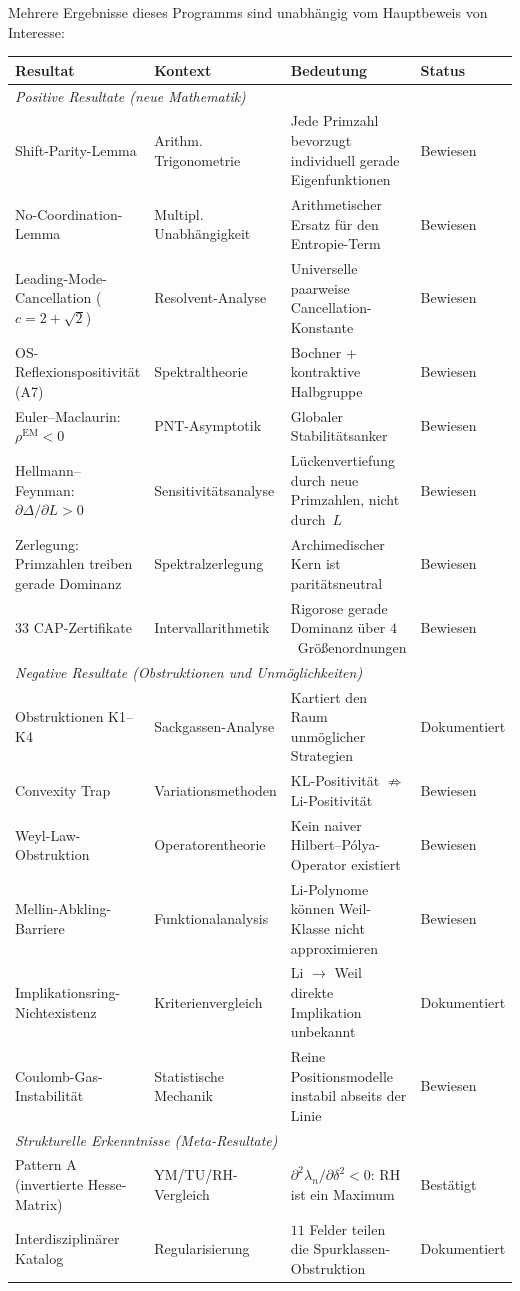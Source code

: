 \documentclass[12pt,a4paper]{article}
\theoremstyle{definition}
\theoremstyle{remark}
\begin{document}
Mehrere Ergebnisse dieses Programms sind unabhängig vom Hauptbeweis von Interesse:

\begin{center}
\small
\renewcommand{\arraystretch}{1.2}
\begin{tabular}{p{4.2cm}|p{3.2cm}|p{4.2cm}|l}
\textbf{Resultat} & \textbf{Kontext} & \textbf{Bedeutung} & \textbf{Status} \\\hline
\multicolumn{4}{l}{\emph{Positive Resultate (neue Mathematik)}} \\[2pt]
Shift-Parity-Lemma & Arithm. Trigonometrie & Jede Primzahl bevorzugt individuell gerade Eigenfunktionen & Bewiesen \\
No-Coordination-Lemma & Multipl. Unabhängigkeit & Arithmetischer Ersatz für den Entropie-Term & Bewiesen \\
Leading-Mode-Cancellation ($c = 2+\sqrt{2}$) & Resolvent-Analyse & Universelle paarweise Cancellation-Konstante & Bewiesen \\
OS-Reflexionspositivität (A7) & Spektraltheorie & Bochner + kontraktive Halbgruppe & Bewiesen \\
Euler--Maclaurin: $\rho^{\mathrm{EM}} < 0$ & PNT-Asymptotik & Globaler Stabilitätsanker & Bewiesen \\
Hellmann--Feynman: $\partial\Delta/\partial L > 0$ & Sensitivitätsanalyse & Lückenvertiefung durch neue Primzahlen, nicht durch~$L$ & Bewiesen \\
Zerlegung: Primzahlen treiben gerade Dominanz & Spektralzerlegung & Archimedischer Kern ist paritätsneutral & Bewiesen \\
$33$ CAP-Zertifikate & Intervallarithmetik & Rigorose gerade Dominanz über $4$~Größenordnungen & Bewiesen \\[4pt]
\multicolumn{4}{l}{\emph{Negative Resultate (Obstruktionen und Unmöglichkeiten)}} \\[2pt]
Obstruktionen K1--K4 & Sackgassen-Analyse & Kartiert den Raum unmöglicher Strategien & Dokumentiert \\
Convexity Trap & Variationsmethoden & KL-Positivität $\not\Rightarrow$ Li-Positivität & Bewiesen \\
Weyl-Law-Obstruktion & Operatorentheorie & Kein naiver Hilbert--P\'olya-Operator existiert & Bewiesen \\
Mellin-Abkling-Barriere & Funktionalanalysis & Li-Polynome können Weil-Klasse nicht approximieren & Bewiesen \\
Implikationsring-Nichtexistenz & Kriterienvergleich & Li $\to$ Weil direkte Implikation unbekannt & Dokumentiert \\
Coulomb-Gas-Instabilität & Statistische Mechanik & Reine Positionsmodelle instabil abseits der Linie & Bewiesen \\[4pt]
\multicolumn{4}{l}{\emph{Strukturelle Erkenntnisse (Meta-Resultate)}} \\[2pt]
Pattern A (invertierte Hesse-Matrix) & YM/TU/RH-Vergleich & $\partial^2\lambda_n/\partial\delta^2 < 0$: RH ist ein Maximum & Bestätigt \\
Interdisziplinärer Katalog & Regularisierung & $11$ Felder teilen die Spurklassen-Obstruktion & Dokumentiert
\end{tabular}
\end{center}
\end{document}
